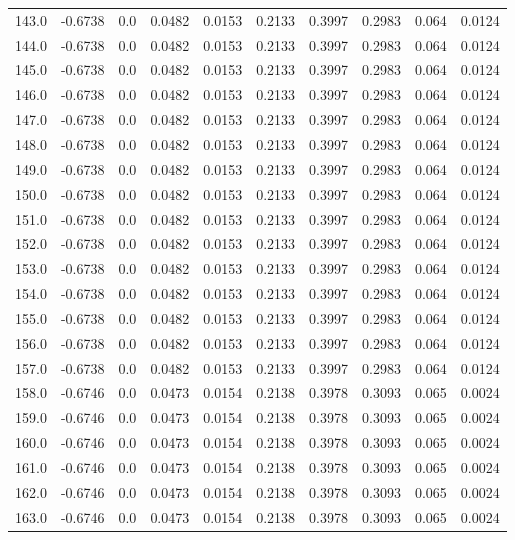 \begin{longtable}{lrrrrrrrrr}
143.0 & -0.6738 & 0.0 & 0.0482 & 0.0153 & 0.2133 & 0.3997 & 0.2983 & 0.064 & 0.0124 \\
144.0 & -0.6738 & 0.0 & 0.0482 & 0.0153 & 0.2133 & 0.3997 & 0.2983 & 0.064 & 0.0124 \\
145.0 & -0.6738 & 0.0 & 0.0482 & 0.0153 & 0.2133 & 0.3997 & 0.2983 & 0.064 & 0.0124 \\
146.0 & -0.6738 & 0.0 & 0.0482 & 0.0153 & 0.2133 & 0.3997 & 0.2983 & 0.064 & 0.0124 \\
147.0 & -0.6738 & 0.0 & 0.0482 & 0.0153 & 0.2133 & 0.3997 & 0.2983 & 0.064 & 0.0124 \\
148.0 & -0.6738 & 0.0 & 0.0482 & 0.0153 & 0.2133 & 0.3997 & 0.2983 & 0.064 & 0.0124 \\
149.0 & -0.6738 & 0.0 & 0.0482 & 0.0153 & 0.2133 & 0.3997 & 0.2983 & 0.064 & 0.0124 \\
150.0 & -0.6738 & 0.0 & 0.0482 & 0.0153 & 0.2133 & 0.3997 & 0.2983 & 0.064 & 0.0124 \\
151.0 & -0.6738 & 0.0 & 0.0482 & 0.0153 & 0.2133 & 0.3997 & 0.2983 & 0.064 & 0.0124 \\
152.0 & -0.6738 & 0.0 & 0.0482 & 0.0153 & 0.2133 & 0.3997 & 0.2983 & 0.064 & 0.0124 \\
153.0 & -0.6738 & 0.0 & 0.0482 & 0.0153 & 0.2133 & 0.3997 & 0.2983 & 0.064 & 0.0124 \\
154.0 & -0.6738 & 0.0 & 0.0482 & 0.0153 & 0.2133 & 0.3997 & 0.2983 & 0.064 & 0.0124 \\
155.0 & -0.6738 & 0.0 & 0.0482 & 0.0153 & 0.2133 & 0.3997 & 0.2983 & 0.064 & 0.0124 \\
156.0 & -0.6738 & 0.0 & 0.0482 & 0.0153 & 0.2133 & 0.3997 & 0.2983 & 0.064 & 0.0124 \\
157.0 & -0.6738 & 0.0 & 0.0482 & 0.0153 & 0.2133 & 0.3997 & 0.2983 & 0.064 & 0.0124 \\
158.0 & -0.6746 & 0.0 & 0.0473 & 0.0154 & 0.2138 & 0.3978 & 0.3093 & 0.065 & 0.0024 \\
159.0 & -0.6746 & 0.0 & 0.0473 & 0.0154 & 0.2138 & 0.3978 & 0.3093 & 0.065 & 0.0024 \\
160.0 & -0.6746 & 0.0 & 0.0473 & 0.0154 & 0.2138 & 0.3978 & 0.3093 & 0.065 & 0.0024 \\
161.0 & -0.6746 & 0.0 & 0.0473 & 0.0154 & 0.2138 & 0.3978 & 0.3093 & 0.065 & 0.0024 \\
162.0 & -0.6746 & 0.0 & 0.0473 & 0.0154 & 0.2138 & 0.3978 & 0.3093 & 0.065 & 0.0024 \\
163.0 & -0.6746 & 0.0 & 0.0473 & 0.0154 & 0.2138 & 0.3978 & 0.3093 & 0.065 & 0.0024 \\

\end{longtable}
